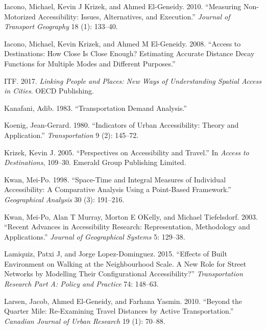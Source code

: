 \documentclass[preprint, 3p,
authoryear]{elsarticle} %
\newlength{\cslhangindent}
\newlength{\cslentryspacingunit} %
\newenvironment{CSLReferences}[2] %
 {%
  \setlength{\parindent}{0pt}
  \ifodd #1
  \let\oldpar\par
  \def\par{\hangindent=\cslhangindent\oldpar}
  \fi
  \setlength{\parskip}{#2\cslentryspacingunit}
 }%
 {}
\begin{document}
\begin{CSLReferences}{1}{0}
\leavevmode{}%
Iacono, Michael, Kevin J Krizek, and Ahmed El-Geneidy. 2010.
{``Measuring Non-Motorized Accessibility: Issues, Alternatives, and
Execution.''} \emph{Journal of Transport Geography} 18 (1): 133--40.

\leavevmode{}%
Iacono, Michael, Kevin Krizek, and Ahmed M El-Geneidy. 2008. {``Access
to Destinations: How Close Is Close Enough? Estimating Accurate Distance
Decay Functions for Multiple Modes and Different Purposes.''}

\leavevmode{}%
ITF. 2017. \emph{Linking People and Places: New Ways of Understanding
Spatial Access in Cities}. OECD Publishing.

\leavevmode{}%
Kanafani, Adib. 1983. {``Transportation Demand Analysis.''}

\leavevmode{}%
Koenig, Jean-Gerard. 1980. {``Indicators of Urban Accessibility: Theory
and Application.''} \emph{Transportation} 9 (2): 145--72.

\leavevmode{}%
Krizek, Kevin J. 2005. {``Perspectives on Accessibility and Travel.''}
In \emph{Access to Destinations}, 109--30. Emerald Group Publishing
Limited.

\leavevmode{}%
Kwan, Mei-Po. 1998. {``Space-Time and Integral Measures of Individual
Accessibility: A Comparative Analysis Using a Point-Based Framework.''}
\emph{Geographical Analysis} 30 (3): 191--216.

\leavevmode{}%
Kwan, Mei-Po, Alan T Murray, Morton E OKelly, and Michael Tiefelsdorf.
2003. {``Recent Advances in Accessibility Research: Representation,
Methodology and Applications.''} \emph{Journal of Geographical Systems}
5: 129--38.

\leavevmode{}%
Lamiquiz, Patxi J, and Jorge Lopez-Dominguez. 2015. {``Effects of Built
Environment on Walking at the Neighbourhood Scale. A New Role for Street
Networks by Modelling Their Configurational Accessibility?''}
\emph{Transportation Research Part A: Policy and Practice} 74: 148--63.

\leavevmode{}%
Larsen, Jacob, Ahmed El-Geneidy, and Farhana Yasmin. 2010. {``Beyond the
Quarter Mile: Re-Examining Travel Distances by Active Transportation.''}
\emph{Canadian Journal of Urban Research} 19 (1): 70--88.


\end{CSLReferences}
\end{document}
